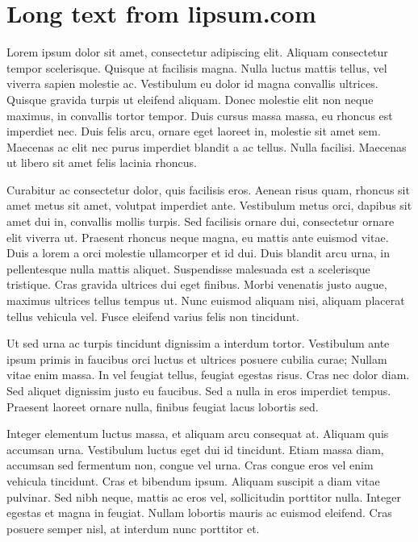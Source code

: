 \documentclass[%
  a4paper,
  10pt,
  version=last
]{scrartcl}
\begin{document}
  \section{Long text from lipsum.com}

  Lorem ipsum dolor sit amet, consectetur adipiscing elit. Aliquam consectetur
  tempor scelerisque. Quisque at facilisis magna. Nulla luctus mattis tellus,
  vel viverra sapien molestie ac. Vestibulum eu dolor id magna convallis
  ultrices.  Quisque gravida turpis ut eleifend aliquam. Donec molestie elit
  non neque maximus, in convallis tortor tempor. Duis cursus massa massa, eu
  rhoncus est imperdiet nec. Duis felis arcu, ornare eget laoreet in, molestie
  sit amet sem.  Maecenas ac elit nec purus imperdiet blandit a ac tellus.
  Nulla facilisi.  Maecenas ut libero sit amet felis lacinia rhoncus.

  Curabitur ac consectetur dolor, quis facilisis eros. Aenean risus quam,
  rhoncus sit amet metus sit amet, volutpat imperdiet ante. Vestibulum metus
  orci, dapibus sit amet dui in, convallis mollis turpis. Sed facilisis ornare
  dui, consectetur ornare elit viverra ut. Praesent rhoncus neque magna, eu
  mattis ante euismod vitae. Duis a lorem a orci molestie ullamcorper et id
  dui. Duis blandit arcu urna, in pellentesque nulla mattis aliquet.
  Suspendisse malesuada est a scelerisque tristique. Cras gravida ultrices dui
  eget finibus. Morbi venenatis justo augue, maximus ultrices tellus tempus ut.
  Nunc euismod aliquam nisi, aliquam placerat tellus vehicula vel. Fusce
  eleifend varius felis non tincidunt.

  Ut sed urna ac turpis tincidunt dignissim a interdum tortor. Vestibulum ante
  ipsum primis in faucibus orci luctus et ultrices posuere cubilia curae;
  Nullam vitae enim massa. In vel feugiat tellus, feugiat egestas risus. Cras
  nec dolor diam. Sed aliquet dignissim justo eu faucibus. Sed a nulla in eros
  imperdiet tempus. Praesent laoreet ornare nulla, finibus feugiat lacus
  lobortis sed.

  Integer elementum luctus massa, et aliquam arcu consequat at. Aliquam quis
  accumsan urna. Vestibulum luctus eget dui id tincidunt. Etiam massa diam,
  accumsan sed fermentum non, congue vel urna. Cras congue eros vel enim
  vehicula tincidunt. Cras et bibendum ipsum. Aliquam suscipit a diam vitae
  pulvinar. Sed nibh neque, mattis ac eros vel, sollicitudin porttitor nulla.
  Integer egestas et magna in feugiat. Nullam lobortis mauris ac euismod
  eleifend. Cras posuere semper nisl, at interdum nunc porttitor et.
\end{document}
